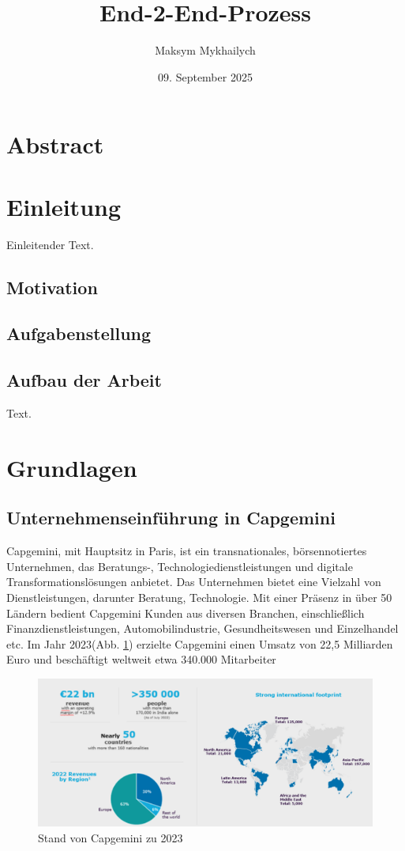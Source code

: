 \documentclass[a4paper, 12pt]{scrartcl}
\title{End-2-End-Prozess}
\author{Maksym Mykhailych}
\date{09. September 2025}
\begin{document}
	\maketitle
	\newpage
	\section*{Abstract}
	\newpage 	
	\tableofcontents
	\newpage
	
	\newpage
	\section{Einleitung}
	Einleitender Text.
	\newpage
	\subsection{Motivation}
	\subsection{Aufgabenstellung}
	\subsection{Aufbau der Arbeit}
	Text.
	\newpage
	\section{Grundlagen}
	\subsection{Unternehmenseinführung in Capgemini} %
Capgemini, mit Hauptsitz in Paris, ist ein transnationales, börsennotiertes Unternehmen, das Beratungs-, Technologiedienstleistungen und digitale Transformationslösungen anbietet. Das Unternehmen bietet eine Vielzahl von Dienstleistungen, darunter Beratung, Technologie. Mit einer Präsenz in über 50 Ländern bedient Capgemini Kunden aus diversen Branchen, einschließlich Finanzdienstleistungen, Automobilindustrie, Gesundheitswesen und Einzelhandel etc. Im Jahr 2023(Abb. \ref{Stand von Capgemini}) erzielte Capgemini einen Umsatz von 22,5 Milliarden Euro und beschäftigt weltweit etwa 340.000 Mitarbeiter
	\begin{figure}[h!]
		\begin{center}
			\includegraphics[width=12cm]{CApgemini zahlen.png}
			\caption{Stand von Capgemini zu 2023\cite{WinNT}}
			\label{Stand von Capgemini}
		\end{center}
	\end{figure}
\end{document}
